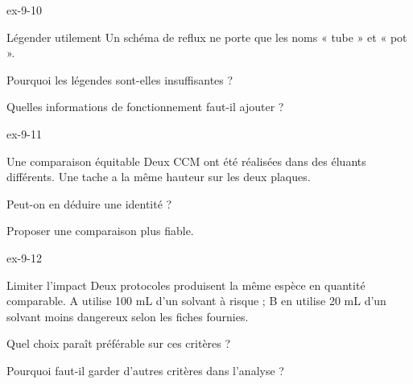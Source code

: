 \begin{blocLivre}{ex-9-10}\begin{exercice}[3]{Légender utilement}
Un schéma de reflux ne porte que les noms « tube » et « pot ».
\begin{questions}
\item Pourquoi les légendes sont-elles insuffisantes ?
\item Quelles informations de fonctionnement faut-il ajouter ?
\end{questions}
\end{exercice}\end{blocLivre}
\begin{blocLivre}{ex-9-11}\begin{exercice}[3]{Une comparaison équitable}
Deux CCM ont été réalisées dans des éluants différents. Une tache a la même hauteur sur les deux plaques.
\begin{questions}
\item Peut-on en déduire une identité ?
\item Proposer une comparaison plus fiable.
\end{questions}
\end{exercice}\end{blocLivre}
\begin{blocLivre}{ex-9-12}\begin{exercice}[3]{Limiter l’impact}
Deux protocoles produisent la même espèce en quantité comparable. A utilise 100 mL d’un solvant à risque ; B en utilise 20 mL d’un solvant moins dangereux selon les fiches fournies.
\begin{questions}
\item Quel choix paraît préférable sur ces critères ?
\item Pourquoi faut-il garder d’autres critères dans l’analyse ?
\end{questions}
\end{exercice}\end{blocLivre}

